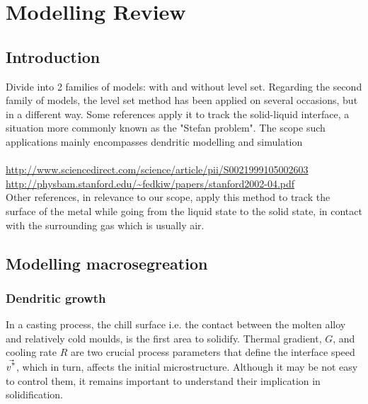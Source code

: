\chapter{Modelling Review}
\begin{nolinkcolors} 
\minitoc
\end{nolinkcolors}
\newpage

\section{Introduction}
Divide into 2 families of models: with and without level set. Regarding the second family of models,
the level set method has been applied on several occasions, but in a different way. Some references
apply it to track the solid-liquid interface, a situation more commonly known as the "Stefan problem".
The scope such applications mainly encompasses dendritic modelling and simulation \\
 \\
\url{http://www.sciencedirect.com/science/article/pii/S0021999105002603} \\
\url{http://physbam.stanford.edu/~fedkiw/papers/stanford2002-04.pdf} \\
Other references, in relevance to our scope, apply this method to track the surface of the metal
while going from the liquid state to the solid state, in contact with the surrounding gas which is usually air.
%
%
\section{Modelling macrosegreation}
%
%
\subsection{Dendritic growth}
In a casting process, the chill surface i.e. the contact between the molten alloy and relatively cold moulds, is the first area to solidify. 
Thermal gradient, $G$, and cooling rate $R$ are two crucial process parameters that define the interface speed $\vec{v^\text{*}}$, which in turn,
affects the initial microstructure. Although it may be not easy to control them, it remains important to understand their implication in solidification.

